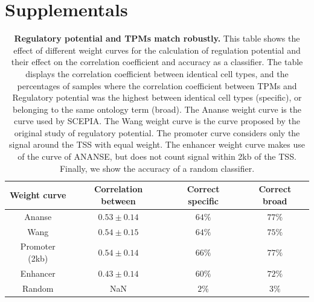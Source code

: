 \section{Supplementals}
\beginsupplement
\begin{table}
    \begin{center}
        \begin{tabular}{||c c c c||} 
        \hline
        Weight curve & Correlation between & Correct specific & Correct broad \\[0.5ex] 
        \hline
        Ananse\cite{Xu_2020}& $0.53 \pm 0.14$ & $64\%$ & $77\%$ \\ 
        \hline
        Wang\cite{Wang2016} & $0.54 \pm 0.15 $ & $64\%$ & $75\%$ \\
        \hline
        Promoter (2kb) & $0.54 \pm 0.14$ & $66\%$ & $77\%$ \\
        \hline
        Enhancer & $0.43 \pm 0.14$ & $60\%$ & $72\%$ \\
        \hline
        Random & NaN & $2\%$ & $3\%$ \\
        \hline
        \end{tabular}
        \caption{\textbf{Regulatory potential and TPMs match robustly.} This table shows the effect of different weight curves for the calculation of regulation potential and their effect on the correlation coefficient and accuracy as a classifier. The table displays the correlation coefficient between identical cell types, and the percentages of samples where the correlation coefficient between TPMs and Regulatory potential was the highest between identical cell types (specific), or belonging to the same ontology term (broad). The Ananse weight curve is the curve used by SCEPIA. The Wang weight curve is the curve proposed by the original study of regulatory potential. The promoter curve considers only the signal around the TSS with equal weight. The enhancer weight curve makes use of the curve of ANANSE, but does not count signal within 2kb of the TSS. Finally, we show the accuracy of a random classifier.}
        \label{table:correlations}
    \end{center}
\end{table}
